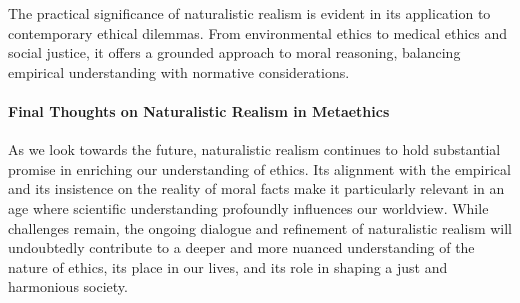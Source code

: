 \documentclass[12pt,a4paper]{article}
\begin{document}
The practical significance of naturalistic realism is evident in its application to contemporary ethical dilemmas. From environmental ethics to medical ethics and social justice, it offers a grounded approach to moral reasoning, balancing empirical understanding with normative considerations.

\paragraph{Final Thoughts on Naturalistic Realism in Metaethics}
As we look towards the future, naturalistic realism continues to hold substantial promise in enriching our understanding of ethics. Its alignment with the empirical and its insistence on the reality of moral facts make it particularly relevant in an age where scientific understanding profoundly influences our worldview. While challenges remain, the ongoing dialogue and refinement of naturalistic realism will undoubtedly contribute to a deeper and more nuanced understanding of the nature of ethics, its place in our lives, and its role in shaping a just and harmonious society.


\printbibliography
\end{document}
